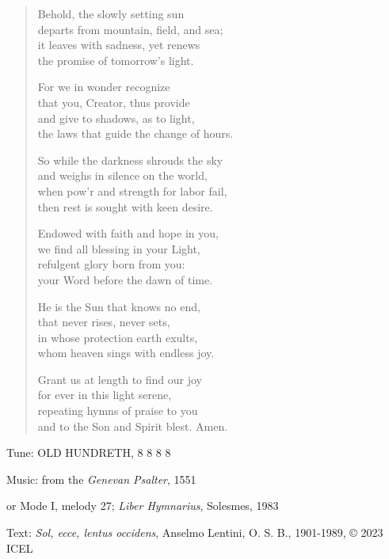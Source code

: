 \hymn

\begin{verse}
Behold, the slowly setting sun\\
departs from mountain, field, and sea;\\
it leaves with sadness, yet renews\\
the promise of tomorrow’s light.

For we in wonder recognize\\
that you, Creator, thus provide\\
and give to shadows, as to light,\\
the laws that guide the change of hours.

So while the darkness shrouds the sky\\
and weighs in silence on the world,\\
when pow’r and strength for labor fail,\\
then rest is sought with keen desire.

Endowed with faith and hope in you,\\
we find all blessing in your Light,\\
refulgent glory born from you:\\
your Word before the dawn of time.

He is the Sun that knows no end,\\
that never rises, never sets,\\
in whose protection earth exults,\\
whom heaven sings with endless joy.

Grant us at length to find our joy\\
for ever in this light serene,\\
repeating hymns of praise to you\\
and to the Son and Spirit blest. Amen.
\end{verse}

\begin{hymnsource}
Tune: OLD HUNDRETH, 8 8 8 8

Music: from the \emph{Genevan Psalter}, 1551

or Mode I, melody 27; \emph{Liber Hymnarius}, Solesmes, 1983

Text: \emph{Sol, ecce, lentus occidens}, Anselmo Lentini, O. S. B., 1901-1989, © 2023 ICEL
\end{hymnsource}